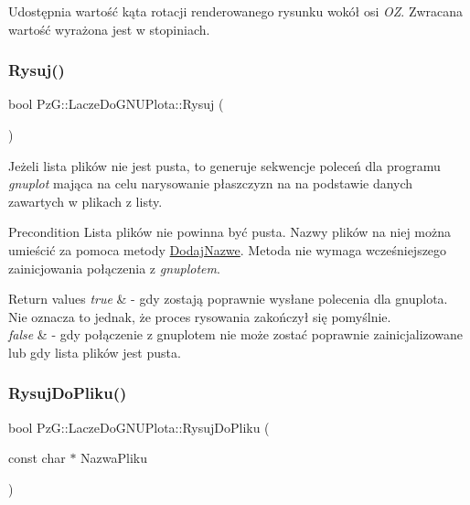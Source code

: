 Udostępnia wartość kąta rotacji renderowanego rysunku wokół osi {\itshape OZ}. Zwracana wartość wyrażona jest w stopiniach. \mbox{\label{classPzG_1_1LaczeDoGNUPlota_a065f5b8402737cc62b0ad4f66d028335}} 
\subsubsection{\texorpdfstring{Rysuj()}{Rysuj()}}
{\footnotesize\ttfamily bool Pz\+G\+::\+Lacze\+Do\+G\+N\+U\+Plota\+::\+Rysuj (\begin{DoxyParamCaption}{ }\end{DoxyParamCaption})}

Jeżeli lista plików nie jest pusta, to generuje sekwencje poleceń dla programu {\itshape gnuplot} mająca na celu narysowanie płaszczyzn na na podstawie danych zawartych w plikach z listy.

\begin{DoxyPrecond}{Precondition}
Lista plików nie powinna być pusta. Nazwy plików na niej można umieścić za pomoca metody \hyperlink{}{Dodaj\+Nazwe}. Metoda nie wymaga wcześniejszego zainicjowania połączenia z {\itshape gnuplotem}. 
\end{DoxyPrecond}

\begin{DoxyRetVals}{Return values}
{\em true} & -\/ gdy zostają poprawnie wysłane polecenia dla gnuplota. Nie oznacza to jednak, że proces rysowania zakończył się pomyślnie. \\
\hline
{\em false} & -\/ gdy połączenie z gnuplotem nie może zostać poprawnie zainicjalizowane lub gdy lista plików jest pusta. \\
\hline
\end{DoxyRetVals}
\mbox{\label{classPzG_1_1LaczeDoGNUPlota_addae9ac156ae2fb227f792faff3aa148}} 
\subsubsection{\texorpdfstring{Rysuj\+Do\+Pliku()}{RysujDoPliku()}}
{\footnotesize\ttfamily bool Pz\+G\+::\+Lacze\+Do\+G\+N\+U\+Plota\+::\+Rysuj\+Do\+Pliku (\begin{DoxyParamCaption}\item[{const char $\ast$}]{Nazwa\+Pliku }\end{DoxyParamCaption})}

